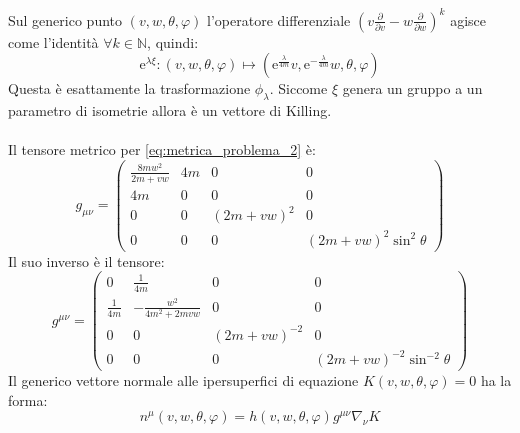 \documentclass[]{scrartcl}
\newcommand{\me}{\mathrm{e}}
\newcommand{\pfrac}[1]{\frac{\partial}{\partial #1}}
\begin{document}
Sul generico punto $ (v,w,\theta,\varphi) $ l'operatore differenziale $ \left( v \pfrac{v} - w \pfrac{w} \right)^k $ agisce come l'identità
$ \forall k \in \mathbb{N} $, quindi:
\[
  \me^{\lambda \xi} : \left( v,w,\theta,\varphi \right) \mapsto \left( \me^\frac{\lambda}{4m} v, \me^{-\frac{\lambda}{4m}} w, \theta, \varphi  \right)
\]
Questa è esattamente la trasformazione $ \phi_\lambda $. Siccome $ \xi $ genera un gruppo a un parametro di isometrie allora è un vettore di Killing. \\ \\
Il tensore metrico per \eqref{eq:metrica_problema_2} è:
\[
  g_{\mu\nu} =
  \begin{pmatrix}
    \frac{8 m w^2}{2m + vw} & 4m                                & 0                           & 0 \\
    4m                      & 0                                 & 0                           & 0 \\
    0                       & 0                                 & \left( 2m + vw \right)^2    & 0 \\
    0                       & 0                                 & 0                           & \left( 2m + vw \right)^2 \sin^2 \theta
  \end{pmatrix}
\]
Il suo inverso è il tensore:
\[
  g^{\mu\nu} =
  \begin{pmatrix}
    0                       & \frac{1}{4m}                      & 0                           & 0 \\
    \frac{1}{4m}            & - \frac{w^2}{4m^2 + 2mvw} & 0                           & 0 \\
    0                       & 0                                 & \left( 2m + vw \right)^{-2} & 0 \\
    0                       & 0                                 & 0                           & \left( 2m + vw \right)^{-2} \sin^{-2} \theta
  \end{pmatrix}
\]
Il generico vettore normale alle ipersuperfici di equazione $ K(v,w,\theta,\varphi) = 0 $ ha la forma:
\begin{equation}
  \label{eq:vettore_normale}
  n^\mu(v,w,\theta,\varphi) = h(v,w,\theta,\varphi) g^{\mu\nu}\nabla_\nu K
\end{equation}
\end{document}
